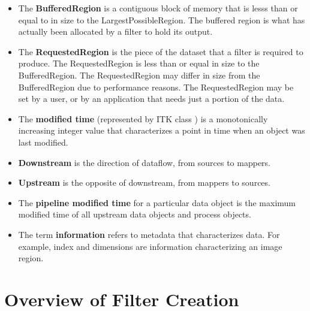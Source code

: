 \begin{itemize}
        \item The \textbf{BufferedRegion} is a contiguous block of memory
        that is lesss than or equal to in size to the
        LargestPossibleRegion. The buffered region is what has actually been
        allocated by a filter to hold its output.

        \item The \textbf{RequestedRegion} is the piece of the dataset that a
        filter is required to produce. The RequestedRegion is less than or
        equal in size to the BufferedRegion. The RequestedRegion may differ
        in size from the BufferedRegion due to performance reasons. The
        RequestedRegion may be set by a user, or by an application that needs
        just a portion of the data.

        \item The \textbf{modified time} (represented by ITK class
        ) is a monotonically increasing integer value that
        characterizes a point in time when an object was last modified.

        \item \textbf{Downstream} is the direction of dataflow, from sources
        to mappers.

        \item \textbf{Upstream} is the opposite of downstream, from mappers
        to sources.

        \item The \textbf{pipeline modified time} for a particular data
        object is the maximum modified time of all upstream data objects and
        process objects.

        \item The term \textbf{information} refers to metadata that
        characterizes data. For example, index and dimensions are information
        characterizing an image region.
\end{itemize}

\section{Overview of Filter Creation}
\label{sec:OverviewFilterCreation}

